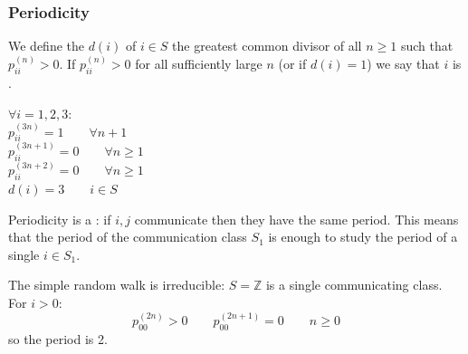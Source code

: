 \documentclass{article}
\begin{document}
\subsubsection{Periodicity}
\begin{definition}
    We define the  $d(i)$ of $i\in S$ the greatest common divisor of all $n\geqslant 1$ such that $p_{ii}^{(n)}>0$. If $p_{ii}^{(n)}>0$ for all sufficiently large $n$ (or if $d(i)=1$) we say that $i$ is .
\end{definition}
\begin{example}
     \begin{minipage}{0.5\textwidth}
        \begin{figure}[H]
            \centering
        \end{figure}
    \end{minipage} \hfill
    \begin{minipage}{0.45\textwidth}
        $\forall i=1,2,3:$\medskip \\
        $p_{ii}^{(3n)}=1\qquad \forall n+1$\\
        $p_{ii}^{(3n+1)}=0\qquad \forall n\geqslant 1$\\
        $p_{ii}^{(3n+2)}=0\qquad \forall n\geqslant 1$\\
        $d(i)=3 \qquad i\in S$
    \end{minipage}
\end{example}
Periodicity is a : if $i,j$ communicate then they have the same period. This means that the period of the communication class $S_1$ is enough to study the period of a single $i\in S_1$.
\begin{example}
    The simple random walk is irreducible: $S = \mathbb{Z}$ is a single communicating class. For $i>0$:
    \[
    p_{00}^{(2n)}>0 \qquad p_{00}^{(2n+1)}=0 \qquad n \geqslant 0
    \]
    so the period is 2.
\end{example}
\end{document}
